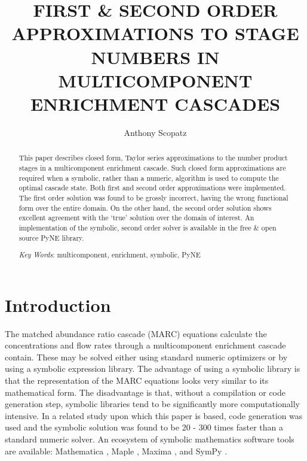 \documentclass{ansconf}
\begin{document}
\title{FIRST \& SECOND ORDER APPROXIMATIONS TO STAGE NUMBERS IN 
       MULTICOMPONENT ENRICHMENT CASCADES}

\author{Anthony Scopatz}

\maketitle

\begin{abstract}
\raggedright
This paper describes closed form, Taylor series approximations to the number 
product stages in a multicomponent enrichment cascade.  Such closed form 
approximations are required when a symbolic, rather than a numeric, algorithm
is used to compute the optimal cascade state.  Both first and second order 
approximations were implemented.  The first order solution was found to be 
grossly incorrect, having the wrong functional form over the entire domain.
On the other hand, the second order solution shows excellent agreement with 
the `true' solution over the domain of interest. An implementation of the 
symbolic, second order solver is available in the free \& open source 
PyNE library.

\emph{Key Words}: multicomponent, enrichment, symbolic, PyNE
\end{abstract}

\section{Introduction}
\label{sec:intro}

The matched abundance ratio cascade (MARC) equations calculate the concentrations
and flow rates through a multicomponent enrichment cascade contain. These may
be solved either using standard numeric optimizers or by using a symbolic 
expression library.  The advantage of using a symbolic library is that the 
representation of the MARC equations looks very similar to its mathematical form.
The disadvantage is that, without a compilation or code generation step, symbolic 
libraries tend to be significantly more computationally intensive.  In a related 
study upon which this paper is based, code generation was used and the symbolic
solution was found to be 20 - 300 times faster than a standard numeric solver.
An ecosystem of symbolic mathematics software tools are available: 
Mathematica \cite{Wolfram2008}, Maple \cite{Maple16},  Maxima \cite{Maxima5}, 
and SymPy \cite{SymPy2012}.  
\end{document}
